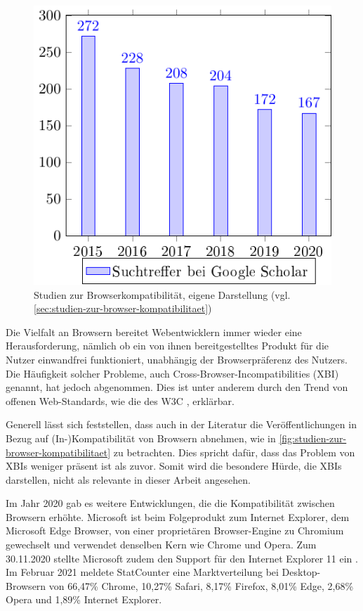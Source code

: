 \begin{figure}
\centering
\includegraphics[width=\linewidth]{img/02_theorie/cross-browser_metastudie.png.pdf}
\caption{Studien zur Browserkompatibilität, eigene Darstellung (vgl. \autoref{sec:studien-zur-browser-kompatibilitaet})}
\label{fig:studien-zur-browser-kompatibilitaet}
\end{figure}

Die Vielfalt an Browsern bereitet Webentwicklern immer wieder eine Herausforderung, nämlich ob ein von ihnen bereitgestelltes Produkt für die Nutzer einwandfrei funktioniert, unabhängig der Browserpräferenz des Nutzers. Die Häufigkeit solcher Probleme, auch Cross-Browser-Incompatibilities (XBI) \cite{XBIs} genannt, hat jedoch abgenommen. Dies ist unter anderem durch den Trend von offenen Web-Standards, wie die des W3C \cite{W3CStandards}, erklärbar.


Generell lässt sich feststellen, dass auch in der Literatur die Veröffentlichungen in Bezug auf (In-)Kompatibilität von Browsern abnehmen, wie in \autoref{fig:studien-zur-browser-kompatibilitaet} zu betrachten. Dies spricht dafür, dass das Problem von XBIs weniger präsent ist als zuvor. Somit wird die besondere Hürde, die XBIs darstellen, nicht als relevante in dieser Arbeit angesehen.

Im Jahr 2020 gab es weitere Entwicklungen, die die Kompatibilität zwischen Browsern erhöhte. Microsoft ist beim Folgeprodukt zum Internet Explorer, dem Microsoft Edge Browser, von einer proprietären Browser-Engine zu Chromium gewechselt \cite{MicrosoftEdgeChromium} und verwendet denselben Kern wie Chrome und Opera. Zum 30.11.2020 stellte Microsoft zudem den Support für den Internet Explorer 11 ein \cite{MicrosoftInternetExplorerDeprecation}. Im Februar 2021 meldete StatCounter \cite{StatCounterBrowserMarketshare} eine Marktverteilung bei Desktop-Browsern von 66,47\% Chrome, 10,27\% Safari, 8,17\% Firefox, 8,01\% Edge, 2,68\% Opera und 1,89\% Internet Explorer.

